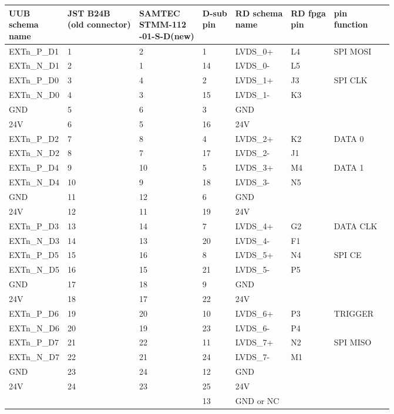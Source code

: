 \documentclass[a4paper,indent]{paper}
\begin{document}
\begin{tabular}{llllllll}
  \shortstack{UUB\\schema\\name} &%
  \shortstack{JST B24B\\(old connector)} &%
  \shortstack{SAMTEC\\STMM-112\\-01-S-D(new)} &%
  \shortstack{D-sub\\pin} &%
  \shortstack{RD schema\\name} &%
  \shortstack{RD fpga\\pin} &%
  \shortstack{pin\\function}
  \\\hline
  EXTn\_P\_D1 & 1   & 2  & 1  & LVDS\_0+  & L4 & SPI MOSI\\
  EXTn\_N\_D1 & 2   & 1  & 14 & LVDS\_0-  & L5 &  \\
  EXTn\_P\_D0 & 3   & 4  & 2  & LVDS\_1+  & J3 & SPI CLK \\
  EXTn\_N\_D0 & 4   & 3  & 15 & LVDS\_1-  & K3 &  \\
  GND         & 5   & 6  & 3  & GND       &    &  \\
  24V         & 6   & 5  & 16 & 24V       &    &  \\
  EXTn\_P\_D2 & 7   & 8  & 4  & LVDS\_2+  & K2 & DATA 0 \\
  EXTn\_N\_D2 & 8   & 7  & 17 & LVDS\_2-  & J1 &  \\
  EXTn\_P\_D4 & 9   & 10 & 5  & LVDS\_3+  & M4 & DATA 1 \\
  EXTn\_N\_D4 & 10  & 9  & 18 & LVDS\_3-  & N5 &  \\
  GND         & 11  & 12 & 6  & GND       &    &  \\
  24V         & 12  & 11 & 19 & 24V       &    &  \\
  EXTn\_P\_D3 & 13  & 14 & 7  & LVDS\_4+  & G2 & DATA CLK \\
  EXTn\_N\_D3 & 14  & 13 & 20 & LVDS\_4-  & F1 &  \\
  EXTn\_P\_D5 & 15  & 16 & 8  & LVDS\_5+  & N4 & SPI CE \\
  EXTn\_N\_D5 & 16  & 15 & 21 & LVDS\_5-  & P5 &  \\
  GND         & 17  & 18 & 9  & GND       &    &  \\
  24V         & 18  & 17 & 22 & 24V       &    &  \\
  EXTn\_P\_D6 & 19  & 20 & 10 & LVDS\_6+  & P3 & TRIGGER \\
  EXTn\_N\_D6 & 20  & 19 & 23 & LVDS\_6-  & P4 &  \\
  EXTn\_P\_D7 & 21  & 22 & 11 & LVDS\_7+  & N2 & SPI MISO \\
  EXTn\_N\_D7 & 22  & 21 & 24 & LVDS\_7-  & M1 &  \\
  GND         & 23  & 24 & 12 & GND       &    &  \\
  24V         & 24  & 23 & 25 & 24V       &    &  \\
              &     &    & 13 & GND or NC &    &  \\
\end{tabular}
\end{document}
